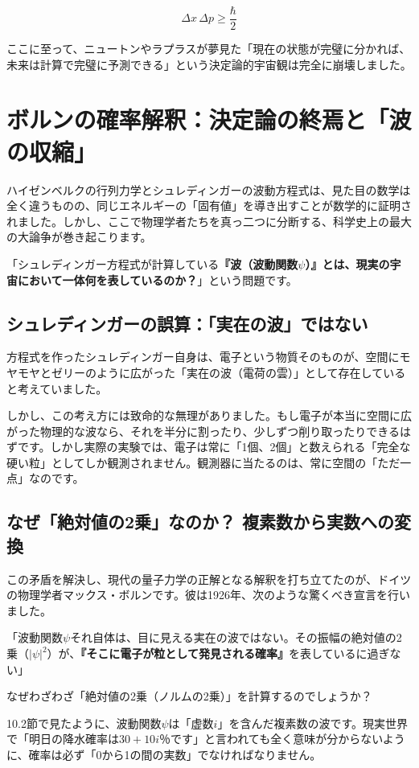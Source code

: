 \[
\Delta x\,\Delta p \geq \frac{\hbar}{2}
\]

ここに至って、ニュートンやラプラスが夢見た「現在の状態が完璧に分かれば、未来は計算で完璧に予測できる」という決定論的宇宙観は完全に崩壊しました。

\section{ボルンの確率解釈：決定論の終焉と「波の収縮」}

ハイゼンベルクの行列力学とシュレディンガーの波動方程式は、見た目の数学は全く違うものの、同じエネルギーの「固有値」を導き出すことが数学的に証明されました。しかし、ここで物理学者たちを真っ二つに分断する、科学史上の最大の大論争が巻き起こります。

「シュレディンガー方程式が計算している\textbf{『波（波動関数\(\psi\)）』とは、現実の宇宙において一体何を表しているのか？}」という問題です。

\subsection{シュレディンガーの誤算：「実在の波」ではない}

方程式を作ったシュレディンガー自身は、電子という物質そのものが、空間にモヤモヤとゼリーのように広がった「実在の波（電荷の雲）」として存在していると考えていました。

しかし、この考え方には致命的な無理がありました。もし電子が本当に空間に広がった物理的な波なら、それを半分に割ったり、少しずつ削り取ったりできるはずです。しかし実際の実験では、電子は常に「1個、2個」と数えられる「完全な硬い粒」としてしか観測されません。観測器に当たるのは、常に空間の「ただ一点」なのです。

\subsection{なぜ「絶対値の2乗」なのか？ 複素数から実数への変換}

この矛盾を解決し、現代の量子力学の正解となる解釈を打ち立てたのが、ドイツの物理学者マックス・ボルンです。彼は1926年、次のような驚くべき宣言を行いました。

「波動関数\(\psi\)それ自体は、目に見える実在の波ではない。その振幅の絶対値の2乗（\(|\psi|^2\)）が、\textbf{『そこに電子が粒として発見される確率』}を表しているに過ぎない」

なぜわざわざ「絶対値の2乗（ノルムの2乗）」を計算するのでしょうか？

10.2節で見たように、波動関数\(\psi\)は「虚数\(i\)」を含んだ複素数の波です。現実世界で「明日の降水確率は\(30 + 10i\)％です」と言われても全く意味が分からないように、確率は必ず「0から1の間の実数」でなければなりません。

